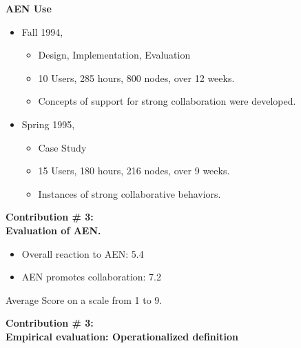 \begin{slide}\Huge 
  {\bf AEN Use}
  \horizontalline\\
  \begin{itemize}\huge
  \item Fall 1994, 
    \begin{itemize}
    \item Design, Implementation, Evaluation
    \item 10 Users, 285 hours, 800 nodes, over 12 weeks.
    \item Concepts of support for strong collaboration were developed.
    \end{itemize}
  \item Spring 1995,
    \begin{itemize}
    \item Case Study
    \item 15 Users, 180 hours, 216 nodes, over 9 weeks.
    \item Instances of strong collaborative behaviors.
    \end{itemize}
  \end{itemize}
\end{slide}


\begin{slide}\Huge 
  {\bf Contribution \# 3:\\Evaluation of AEN.}
  \horizontalline\\
  \begin{itemize}\huge
  \item Overall reaction to AEN: 5.4
  \item AEN promotes collaboration: 7.2
  \end{itemize}
   \begin{center}
    Average Score on a scale from 1 to 9.
  \end{center}
\end{slide}

\begin{slide}\Huge 
  {\bf Contribution \# 3:\\Empirical evaluation: Operationalized definition}
  \horizontalline\\
  \ \\
  \centerline{}
\end{slide}

